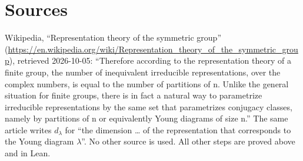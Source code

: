 \documentclass[11pt]{article}
\theoremstyle{definition}
\begin{document}
\section{Sources}\label{sec:sources}
Wikipedia, ``Representation theory of the symmetric group''
(\url{https://en.wikipedia.org/wiki/Representation_theory_of_the_symmetric_group}), retrieved
2026-10-05:
``Therefore according to the representation theory of a finite group, the number of inequivalent
irreducible representations, over the complex numbers, is equal to the number of partitions of n.
Unlike the general situation for finite groups, there is in fact a natural way to parametrize
irreducible representations by the same set that parametrizes conjugacy classes, namely by
partitions of n or equivalently Young diagrams of size n.''
The same article writes $d_\lambda$ for ``the dimension \dots{} of the representation that
corresponds to the Young diagram $\lambda$''. No other source is used. All other steps are proved
above and in Lean.
\end{document}
